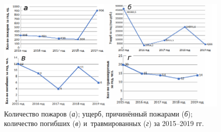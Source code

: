 \begin{figure}[H]
  \begin{center}
    \includegraphics[width=1\textwidth]{authors/zelencov_fig1.png}
  \end{center}
  \caption{Количество пожаров (\textit{а}); ущерб, причинённый пожарами (\textit{б}); количество погибших (\textit{в}) и~травмированных (\textit{г}) за 2015--2019 гг.}
  \label{fig:zelencov-fig1}
\end{figure}
